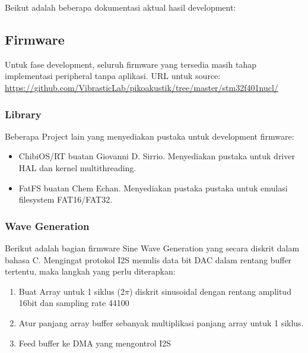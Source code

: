 \documentclass[12pt,]{article}
\begin{document}
	Beikut adalah beberapa dokumentasi aktual hasil development:
	
	\newpage
	\mbox{}
	
	\newpage
	\subsection{Firmware}
	
	Untuk fase development, seluruh firmware yang tersedia masih tahap implementasi peripheral tanpa aplikasi.
	URL untuk source: \url{https://github.com/VibrasticLab/pikoakustik/tree/master/stm32f401nucl/}
	
	\subsubsection{Library}
	
	Beberapa Project lain yang menyediakan pustaka untuk development firmware:
	\begin{itemize}
		\item ChibiOS/RT buatan Giovanni D. Sirrio. Menyediakan pustaka untuk driver HAL dan kernel multithreading.
		\item FatFS buatan Chem Echan. Menyediakan pustaka pustaka untuk emulasi filesystem FAT16/FAT32.
	\end{itemize}

	\subsubsection{Wave Generation}
	 
	 Berikut adalah bagian firmware Sine Wave Generation yang secara diskrit dalam bahasa C.
	 Mengingat protokol I2S menulis data bit DAC dalam rentang buffer tertentu, maka langkah yang perlu diterapkan:
	 \begin{enumerate}
	 	\item Buat Array untuk 1 siklus (2$\pi$) diskrit sinusoidal dengan rentang amplitud 16bit dan sampling rate 44100
	 	\item Atur panjang array buffer sebanyak multiplikasi panjang array untuk 1 siklus.
	 	\item Feed buffer ke DMA yang mengontrol I2S
	 \end{enumerate}
	 
\end{document}
